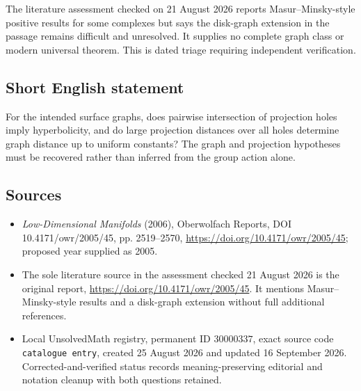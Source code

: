 \documentclass[11pt]{article}
\begin{document}
The literature assessment checked on 21 August 2026 reports Masur--Minsky-style positive results for some complexes but says the disk-graph extension in the passage remains difficult and unresolved. It supplies no complete graph class or modern universal theorem. This is dated triage requiring independent verification.
\subsection{Short English statement}
For the intended surface graphs, does pairwise intersection of projection holes imply hyperbolicity, and do large projection distances over all holes determine graph distance up to uniform constants? The graph and projection hypotheses must be recovered rather than inferred from the group action alone.
\subsection{Sources}
\begin{itemize}
\item \emph{Low-Dimensional Manifolds} (2006), Oberwolfach Reports, DOI 10.4171/owr/2005/45, pp. 2519--2570, \url{https://doi.org/10.4171/owr/2005/45}; proposed year supplied as 2005.
\item The sole literature source in the assessment checked 21 August 2026 is the original report, \url{https://doi.org/10.4171/owr/2005/45}. It mentions Masur--Minsky-style results and a disk-graph extension without full additional references.
\item Local UnsolvedMath registry, permanent ID $30000337$, exact source code \texttt{catalogue entry}, created 25 August 2026 and updated 16 September 2026. Corrected-and-verified status records meaning-preserving editorial and notation cleanup with both questions retained.
\end{itemize}
\end{document}
